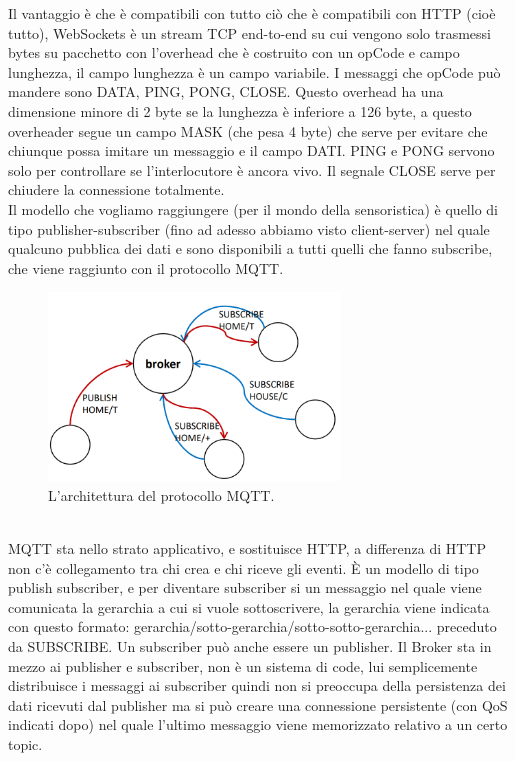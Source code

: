 \documentclass[11pt, twocolumn]{article}
\begin{document}
Il vantaggio è che è compatibili con tutto ciò che è compatibili con HTTP (cioè tutto), WebSockets è un stream TCP end-to-end su cui vengono solo trasmessi bytes su pacchetto con l'overhead che è costruito con un opCode e campo lunghezza, il campo lunghezza è un campo variabile.
I messaggi che opCode può mandere sono DATA, PING, PONG, CLOSE.
Questo overhead ha una dimensione minore di 2 byte se la lunghezza è inferiore a 126 byte, a questo overheader segue un campo MASK (che pesa 4 byte) che serve per evitare che chiunque possa imitare un messaggio e il campo DATI.
PING e PONG servono solo per controllare se l'interlocutore è ancora vivo.
Il segnale CLOSE serve per chiudere la connessione totalmente.\\
Il modello che vogliamo raggiungere (per il mondo della sensoristica) è quello di tipo publisher-subscriber (fino ad adesso abbiamo visto client-server) nel quale qualcuno pubblica dei dati e sono disponibili a tutti quelli che fanno subscribe, che viene raggiunto con il protocollo MQTT.
\begin{figure}[!h]
  \centering
  \includegraphics[width=\linewidth,height=5cm]{imgs/mqtt.png}
  \caption{L'architettura del protocollo MQTT.}
  \label{fig:mqtt}
\end{figure}\\
MQTT sta nello strato applicativo, e sostituisce HTTP, a differenza di HTTP non c'è collegamento tra chi crea e chi riceve gli eventi.
È un modello di tipo publish subscriber, e per diventare subscriber si un messaggio nel quale viene comunicata la gerarchia a cui si vuole sottoscrivere, la gerarchia viene indicata con questo formato: gerarchia/sotto-gerarchia/sotto-sotto-gerarchia... preceduto da SUBSCRIBE.
Un subscriber può anche essere un publisher.  
Il Broker sta in mezzo ai publisher e subscriber, non è un sistema di code, lui semplicemente distribuisce i messaggi ai subscriber quindi non si preoccupa della persistenza dei dati ricevuti dal publisher ma si può creare una connessione persistente (con QoS indicati dopo) nel quale l'ultimo messaggio viene memorizzato relativo a un certo topic.
\end{document}

